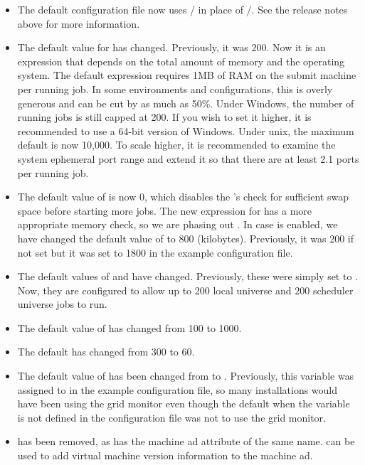 \begin{itemize}

\item The default configuration file now uses
  / in place of
  /.  See the release notes above
  for more information.

\item The default value for  has changed.
  Previously, it was 200.  Now it is an expression that depends on the
  total amount of memory and the operating system.  The default
  expression requires 1MB of RAM on the submit machine per running
  job.  In some environments and configurations, this is overly
  generous and can be cut by as much as 50\%.  Under Windows, the
  number of running jobs is still capped at 200.  If you wish to set
  it higher, it is recommended to use a 64-bit version of Windows.
  Under unix, the maximum default is now 10,000.  To scale higher, it
  is recommended to examine the system ephemeral port range and extend
  it so that there are at least 2.1 ports per running job.

\item The default value of  is now 0, which
  disables the 's check for sufficient swap space
  before starting more jobs.  The new expression for
   has a more appropriate memory check, so
  we are phasing out .  In case
   is enabled, we have changed the default value
  of  to 800 (kilobytes).  Previously,
  it was 200 if not set but it was set to 1800 in the example configuration
  file.

\item The default values of  and
   have changed.  Previously,
  these were simply set to .  Now, they are configured to allow
  up to 200 local universe and 200 scheduler universe jobs to run.

\item The default value of
   has
  changed from 100 to 1000.

\item The default  has changed from 300 to 60.

\item The default value of  has been
  changed from  to .  Previously, this variable
  was assigned to  in the example configuration file, so
  many installations would have been using the grid monitor even
  though the default when the variable is not defined in the
  configuration file was not to use the grid monitor.

\item {} has been removed, as has the machine ad
attribute of the same name.  can be used to
add virtual machine version information to the machine ad.

\end{itemize}

